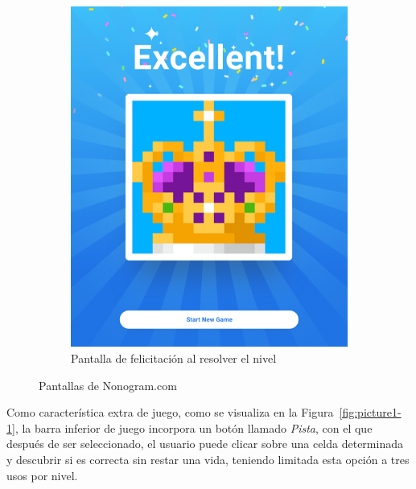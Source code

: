 \documentclass[11pt,spanish,listoffigures,listoftables]{tfgetsinf}
\begin{document}
\begin{figure}[h!]
\begin{subfigure}[b]{0.45\linewidth}
     \includegraphics[width=\linewidth]{images/picturecross2.png}
     \caption{Pantalla de felicitación al resolver el nivel}
     \label{fig:picture1-2}
   \end{subfigure}
   \caption{Pantallas de Nonogram.com}
   \label{fig:picture1}
 \end{figure}

Como característica extra de juego, como se visualiza en la Figura~\ref{fig:picture1-1}, la barra inferior de juego incorpora un botón llamado \textit{Pista}, 
con el que después de ser seleccionado, 
el usuario puede clicar sobre una celda determinada y descubrir si es correcta sin restar una vida, teniendo limitada esta opción a tres usos por nivel.
\end{document}
